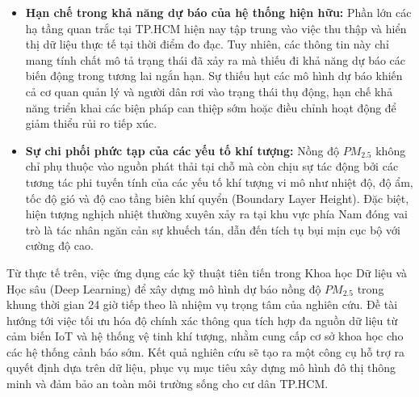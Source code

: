     \begin{itemize}
        \item \textbf{Hạn chế trong khả năng dự báo của hệ thống hiện hữu:} Phần lớn các hạ tầng quan trắc tại TP.HCM hiện nay tập trung vào việc thu thập và hiển thị dữ liệu thực tế tại thời điểm đo đạc. Tuy nhiên, các thông tin này chỉ mang tính chất mô tả trạng thái đã xảy ra mà thiếu đi khả năng dự báo các biến động trong tương lai ngắn hạn. Sự thiếu hụt các mô hình dự báo khiến cả cơ quan quản lý và người dân rơi vào trạng thái thụ động, hạn chế khả năng triển khai các biện pháp can thiệp sớm hoặc điều chỉnh hoạt động để giảm thiểu rủi ro tiếp xúc.
        
        \item \textbf{Sự chi phối phức tạp của các yếu tố khí tượng:} Nồng độ $PM_{2.5}$ không chỉ phụ thuộc vào nguồn phát thải tại chỗ mà còn chịu sự tác động bởi các tương tác phi tuyến tính của các yếu tố khí tượng vi mô như nhiệt độ, độ ẩm, tốc độ gió và độ cao tầng biên khí quyển (Boundary Layer Height). Đặc biệt, hiện tượng nghịch nhiệt thường xuyên xảy ra tại khu vực phía Nam đóng vai trò là tác nhân ngăn cản sự khuếch tán, dẫn đến tích tụ bụi mịn cục bộ với cường độ cao.
    \end{itemize}
    
    Từ thực tế trên, việc ứng dụng các kỹ thuật tiên tiến trong Khoa học Dữ liệu và Học sâu (Deep Learning) để xây dựng mô hình dự báo nồng độ $PM_{2.5}$ trong khung thời gian 24 giờ tiếp theo là nhiệm vụ trọng tâm của nghiên cứu. Đề tài hướng tới việc tối ưu hóa độ chính xác thông qua tích hợp đa nguồn dữ liệu từ cảm biến IoT và hệ thống vệ tinh khí tượng, nhằm cung cấp cơ sở khoa học cho các hệ thống cảnh báo sớm. Kết quả nghiên cứu sẽ tạo ra một công cụ hỗ trợ ra quyết định dựa trên dữ liệu, phục vụ mục tiêu xây dựng mô hình đô thị thông minh và đảm bảo an toàn môi trường sống cho cư dân TP.HCM.
    
